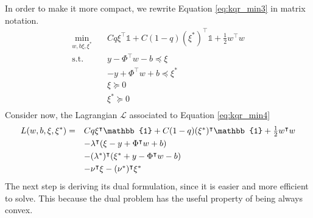 In order to make it more compact, we rewrite Equation \ref{eq:kqr_min3} in matrix notation.
\begin{equation}\label{eq:kqr_min4}
    \begin{aligned}
        \min_{w,b\xi,\xi^*} \quad & C q \xi^\intercal \mathbb{1}+ C (1-q) (\xi^*)^\intercal \mathbb{1}+ \frac{1}{2}w^\intercal w\\
    \textrm{s.t.} \quad & y-\Phi^\intercal w -b \preceq \xi\\
    & -y+\Phi^\intercal w +b \preceq \xi^*\\
      &\xi\succeq0    \\
      &\xi^*\succeq0    \\
    \end{aligned}
    \end{equation}
Consider now, the Lagrangian $\mathcal{L}$ associated to Equation \ref{eq:kqr_min4}
\begin{equation}\label{eq:kqr_min5}
    \begin{split}
        L(w, b, \xi, \xi^*) = \quad & \hbox{$C q \xi^\intercal \mathbb{1} + C (1-q) (\xi^*)^\intercal \mathbb{1} + \frac{1}{2} w^\intercal w$} \\
        & \hbox{$- \lambda^\intercal (\xi - y + \Phi^\intercal w + b)$} \\
        & \hbox{$- (\lambda^*)^\intercal (\xi^* + y - \Phi^\intercal w - b)$} \\
        & \hbox{$- \nu^\intercal \xi - (\nu^*)^\intercal \xi^*$}
    \end{split}
\end{equation}
The next step is deriving its dual formulation, since it is easier and more efficient to solve. This because the dual problem has the useful property of being always convex.

